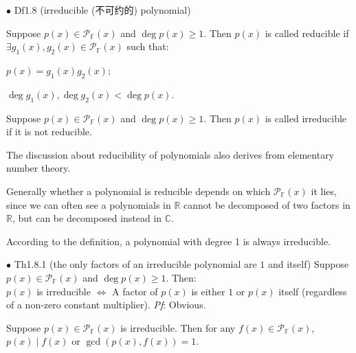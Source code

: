 \documentclass{article}
\begin{document}
\begin{Df}{$\bullet$ Df1.8 (irreducible (不可约的) polynomial)}
    \begin{compactitem}
        \item Suppose $p(x)\in\mathcal{P}_\mathbb{F}(x)$ and $\deg p(x)\geq 1$. Then $p(x)$ is called reducible if $\exists g_1(x), g_2(x)\in\mathcal{P}_\mathbb{F}(x)$ such that:
        \begin{compactenum}
            \item $p(x) = g_1(x)g_2(x)$;
            \item $\deg g_1(x), \deg g_2(x) < \deg p(x)$.
        \end{compactenum}
        \item Suppose $p(x)\in\mathcal{P}_\mathbb{F}(x)$ and $\deg p(x)\geq 1$. Then $p(x)$ is called irreducible if it is not reducible.
    \end{compactitem}
\end{Df}

\begin{Rmk}{}
    \begin{compactenum}
        \item The discussion about reducibility of polynomials also derives from elementary number theory.
        \item Generally whether a polynomial is reducible depends on which $\mathcal{P}_\mathbb{F}(x)$ it lies, since we can often see a polynomials in $\mathbb{R}$ cannot be decomposed of two factors in $\mathbb{R}$, but can be decomposed instead in $\mathbb{C}$.
        \item \textcolor{Th}{According to the definition, a polynomial with degree 1 is always irreducible.}
    \end{compactenum}
\end{Rmk}

\begin{Th}{$\bullet$ Th1.8.1 (the only factors of an irreducible polynomial are $1$ and itself)}
    Suppose $p(x)\in\mathcal{P}_\mathbb{F}(x)$ and $\deg p(x)\geq 1$. Then:\\
    $p(x)$ is irreducible $\Leftrightarrow$ A factor of $p(x)$ is either $1$ or $p(x)$ itself (regardless of a non-zero constant multiplier).
    \tcblower
    \textit{Pf}: Obvious.
\end{Th}

\begin{Rmk}{}
    \begin{compactenum}
        \item \textcolor{Th}{Suppose $p(x)\in\mathcal{P}_\mathbb{F}(x)$ is irreducible. Then for any $f(x)\in\mathcal{P}_\mathbb{F}(x)$, $p(x)\mid f(x)$ or $\gcd(p(x), f(x)) = 1$.}
    \end{compactenum}
\end{Rmk}
\end{document}
